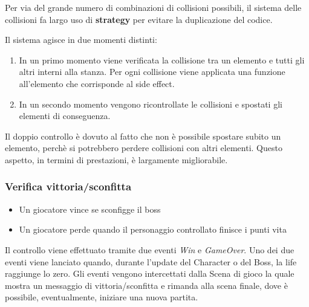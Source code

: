 Per via del grande numero di combinazioni di collisioni possibili, il sistema delle collisioni fa largo uso di \textbf{strategy} per evitare la duplicazione del codice. 

Il sistema agisce in due momenti distinti: 
\begin{enumerate}
  \item In un primo momento viene verificata la collisione tra un elemento e tutti gli altri interni alla stanza. Per ogni collisione viene applicata una funzione all'elemento che corrisponde al side effect.
  \item In un secondo momento vengono ricontrollate le collisioni e spostati gli elementi di conseguenza. 
\end{enumerate}

Il doppio controllo è dovuto al fatto che non è possibile spostare subito un elemento, perchè si potrebbero perdere collisioni con altri elementi.
Questo aspetto, in termini di prestazioni, è largamente migliorabile. 

\subsubsection{Verifica vittoria/sconfitta}
\begin{itemize}
  \item Un giocatore vince se sconfigge il boss
  \item Un giocatore perde quando il personaggio controllato finisce i punti vita
\end{itemize}

Il controllo viene effettuato tramite due eventi \textit{Win} e \textit{GameOver}. 
Uno dei due eventi viene lanciato quando, durante l'update del Character o del Boss, la life raggiunge lo zero. 
Gli eventi vengono intercettati dalla Scena di gioco la quale mostra un messaggio di vittoria/sconfitta e rimanda alla scena finale, dove è possibile, eventualmente, iniziare una nuova partita. 
